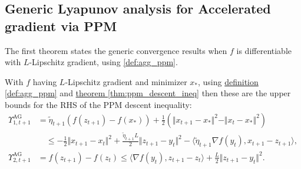 \documentclass[12pt]{article}
\begin{document}
    \subsection{Generic Lyapunov analysis for Accelerated gradient via PPM}
        The first theorem states the generic convergence results when $f$ is differentiable with $L$-Lipschitz gradient, using \ref*{def:agg_ppm}. 
        \begin{lemma}
            With $f$ having $L$-Lipschitz gradient and minimizer $x_*$, using \hyperref[def:agg_ppm]{definition \ref*{def:agg_ppm}} and \hyperref[thm:ppm_descent_ineq]{theorem \ref*{thm:ppm_descent_ineq}} then these are the upper bounds for the RHS of the PPM descent inequality: 
            \begin{align*}
                \Upsilon_{1, t + 1}^{\text{AG}}&= \tilde \eta_{t + 1} (f(z_{t + 1}) - f(x_*))
                + \frac{1}{2}(
                    \Vert x_{t + 1} - x_*\Vert^2 - \Vert x_t - x_* \Vert^2
                )  
                \\
                & \quad \le 
                - \frac{1}{2}\Vert x_{t + 1} - x_t\Vert^2 + 
                \frac{\tilde \eta_{t + 1} L}{2}\Vert z_{t + 1} - y_t\Vert^2
                - 
                \langle \tilde \eta_{t + 1} \nabla f(y_t), x_{t + 1} - z_{t + 1} \rangle, 
                \\
                \Upsilon_{2, t + 1}^{\text{AG}} 
                &= f(z_{t + 1}) - f(z_t) 
                \le 
                \langle \nabla f(y_t), z_{t + 1} - z_t\rangle + 
                \frac{L}{2}\Vert z_{t + 1} - y_t\Vert^2. 
            \end{align*}
        \end{lemma}
\end{document}
